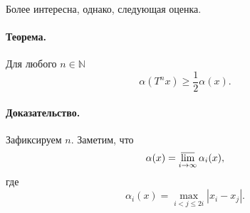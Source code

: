 \documentclass[a4paper,12pt,openbib]{report}
\begin{document}
Более интересна, однако, следующая оценка.
\paragraph{Теорема.}
Для любого $n\in\mathbb{N}$
\begin{equation}
	\alpha(T^n x) \geq \frac{1}{2} \alpha(x)
	.
\end{equation}

\paragraph{Доказательство.}
Зафиксируем $n$.
Заметим, что
\begin{equation}
	\alpha(x) = \varlimsup_{i\to\infty} \alpha_i(x),
\end{equation}
где
\begin{equation}
	\alpha_i(x) = \max_{i < j \leqslant 2i} |x_i - x_j|.
\end{equation}
\end{document}
